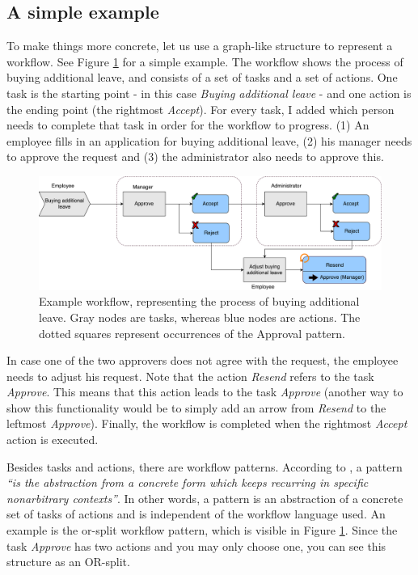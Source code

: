 \documentclass[a4paper,11pt]{article}
\begin{document}

\subsection{A simple example}
To make things more concrete, let us use a graph-like structure to represent a workflow. See Figure \ref{figure:example_workflow} for a simple example. The workflow shows the process of buying additional leave, and consists of a set of tasks and a set of actions. One task is the starting point - in this case \textit{Buying additional leave} - and one action is the ending point (the rightmost \textit{Accept}). For every task, I added which person needs to complete that task in order for the workflow to progress. (1) An employee fills in an application for buying additional leave, (2) his manager needs to approve the request and (3) the administrator also needs to approve this. 

\begin{figure}[H]
\centering
\includegraphics[width=\linewidth]{Example_Workflow.pdf}
\caption{Example workflow, representing the process of buying additional leave. Gray nodes are tasks, whereas blue nodes are actions. The dotted squares represent occurrences of the Approval pattern.}
\label{figure:example_workflow}
\end{figure}

In case one of the two approvers does not agree with the request, the employee needs to adjust his request. Note that the action \textit{Resend} refers to the task \textit{Approve}. This means that this action leads to the task \textit{Approve} (another way to show this functionality would be to simply add an arrow from \textit{Resend} to the leftmost \textit{Approve}). Finally, the workflow is completed when the rightmost \textit{Accept} action is executed.

Besides tasks and actions, there are workflow patterns. According to \cite{Patterns1996}, a pattern \textit{“is the abstraction from a concrete form which keeps recurring in specific nonarbitrary contexts”}. In other words, a pattern is an abstraction of a concrete set of tasks of actions and is independent of the workflow language used. An example is the or-split workflow pattern, which is visible in Figure \ref{figure:example_workflow}. Since the task \textit{Approve} has two actions and you may only choose one, you can see this structure as an OR-split.
\end{document}
